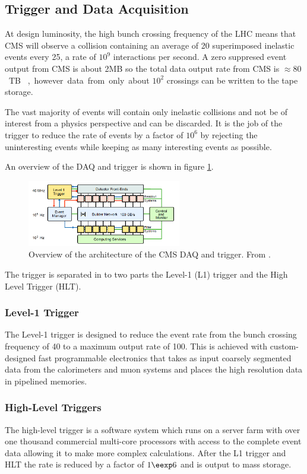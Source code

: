 \subsection{Trigger and Data Acquisition}
At design luminosity, the high bunch crossing frequency of the LHC means that
CMS will observe a collision containing an average of 20 superimposed inelastic
events every \unit{25}{\nano\second}, a rate of $10^{9}$ interactions per
second.
A zero suppresed event output from CMS is about \unit{2}{MB} so the total data
output rate from CMS is \unit{$\approx 80$}{TB \per \second},  however data from
only about $10^{2}$ crossings can be written to the tape storage. 

The vast majority of events will contain only inelastic collisions and not be of
interest from a physics perspective and can be discarded.  
It is the job of the trigger to reduce the rate of events
by a factor of $10^6$ by rejecting the uninteresting events while keeping as
many interesting events as possible.

An overview of the DAQ and trigger is shown in figure \ref{fig:CMSDAQ}.

\begin{figure}[htb!]
  \centering
  \includegraphics[width=0.6\textwidth]{CMSDAQ}
  \caption{Overview of the architecture of the CMS DAQ and trigger. From
  \label{fig:CMSDAQ}
\cite{cms}.}
\end{figure}

The trigger is separated in to two parts the Level-1 (L1) trigger and the High
Level Trigger (HLT).\cite{cms}

\subsubsection{Level-1 Trigger}




The Level-1 trigger is designed to reduce the event rate from the bunch
crossing frequency of \unit{40}{\mega\hertz} to a maximum output rate of
\unit{100}{\kilo\hertz}.
This is achieved with custom-designed fast programmable electronics that takes
as input coarsely segmented data from the calorimeters and muon systems and
places the high resolution data in pipelined memories.



\subsubsection{High-Level Triggers}
The high-level trigger is a software system which runs on a server farm with
over one thousand commercial multi-core processors with access to the complete
event data allowing it to make more complex calculations. After the L1 trigger
and HLT the rate is reduced by a factor of $1 \eexp 6$ and is output to mass
storage.\cite{cms}

